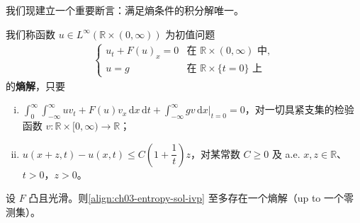 \documentclass[../../main.tex]{subfiles}
\begin{document}
我们现建立一个重要断言：满足熵条件的积分解唯一。

\begin{definition}\label{definition:ch03-entropy-sol}
我们称函数 $u\in L^\infty(\mathbb{R}\times(0,\infty))$ 为初值问题
\begin{align}\label{align:ch03-entropy-sol-ivp}
\begin{cases}
u_t+F(u)_x=0 & \text{在 }\mathbb{R}\times(0,\infty)\text{ 中},\\
u=g & \text{在 }\mathbb{R}\times\{t=0\}\text{ 上}
\end{cases}
\end{align}
的\textbf{熵解}，只要
\begin{enumerate}[(i)]
\item $\int_0^\infty\int_{-\infty}^{\infty}uv_t+F(u)v_x\,\mathrm{d}x\,\mathrm{d}t+\int_{-\infty}^{\infty}gv\,\mathrm{d}x\big|_{t=0}=0$，对一切具紧支集的检验函数 $v:\mathbb{R}\times[0,\infty)\to\mathbb{R}$；
\item $u(x+z,t)-u(x,t)\leqslant C\left(1+\dfrac{1}{t}\right)z$，对某常数 $C\geqslant 0$ 及 a.e. $x,z\in\mathbb{R}$、$t>0$，$z>0$。
\end{enumerate}
\end{definition}

\begin{theorem}[熵解的唯一性]\label{theorem:ch03-entropy-uniqueness}设 $F$ 凸且光滑。则\eqref{align:ch03-entropy-sol-ivp} 至多存在一个熵解（up to 一个零测集）。
\end{theorem}
\end{document}
